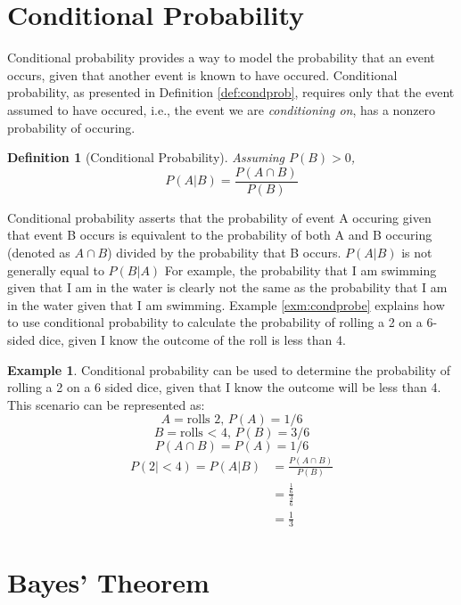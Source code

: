 \documentclass[
  12pt,
]{book}
\theoremstyle{definition}
\newtheorem{definition}{Definition}[chapter]
\theoremstyle{definition}
\newtheorem{example}{Example}[chapter]
\theoremstyle{definition}
\theoremstyle{remark}
\begin{document}
\hypertarget{conditional-probability}{%
\section{Conditional Probability}\label{conditional-probability}}

Conditional probability provides a way to model the probability that an event occurs, given that another event is known to have occured.
Conditional probability, as presented in Definition \ref{def:condprob}, requires only that the event assumed to have occured, i.e., the event we are \emph{conditioning on}, has a nonzero probability of occuring.

\begin{definition}[Conditional Probability]
\protect\hypertarget{def:condprob}{}{\label{def:condprob} {} }\emph{Assuming \(P(B)>0\),}
\[P(A|B)=\frac{P(A \cap B)}{P(B)}\]
\end{definition}

Conditional probability asserts that the probability of event A occuring given that event B occurs is equivalent to the probability of both A and B occuring (denoted as \(A \cap B\)) divided by the probability that B occurs. \(P(A|B)\) is not generally equal to \(P(B|A)\)
For example, the probability that I am swimming given that I am in the water is clearly not the same as the probability that I am in the water given that I am swimming.
Example \ref{exm:condprobe} explains how to use conditional probability to calculate the probability of rolling a 2 on a 6-sided dice, given I know the outcome of the roll is less than 4.

\begin{example}
\protect\hypertarget{exm:condprobe}{}{\label{exm:condprobe} }Conditional probability can be used to determine the probability of rolling a 2 on a 6 sided dice, given that I know the outcome will be less than 4. This scenario can be represented as:
\[A = \textrm{rolls 2, } P(A) = 1/6\]
\[B = \textrm{rolls < 4, } P(B) = 3/6\]
\[P(A \cap B) = P(A) = 1/6\]
\[\begin{split}
P(2|<4) = P(A|B) & = \frac{P(A \cap B)}{P(B)} \\
  & = \frac{\frac{1}{6}}{\frac{3}{6}} \\
  & = \frac{1}{3}
\end{split}\]
\end{example}

\hypertarget{bayes-theorem}{%
\section{Bayes' Theorem}\label{bayes-theorem}}
\end{document}
